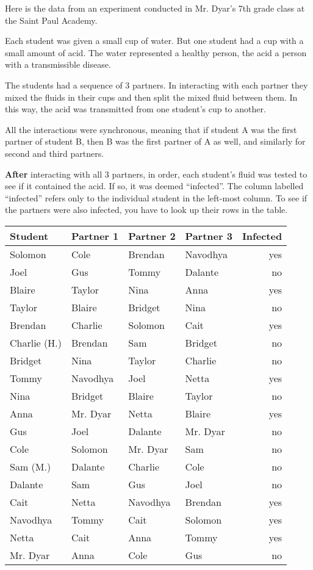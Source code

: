 
Here is the data from an experiment conducted in Mr. Dyar's 7th grade class at the Saint Paul Academy.

Each student was given a small cup of water.  But one student had a cup with a small amount of acid.  The water represented a healthy person, the acid a person with a transmissible disease.

The students had a sequence of 3 partners.   In interacting with each
partner they mixed the fluids in their cups and then split the mixed
fluid between them.  In this way, the acid was transmitted from one
student's cup to another.

All the interactions were synchronous, meaning that if student A was the first partner of student B, then B was the first partner of A as well, and similarly for second and third partners.  

{\bf After} interacting with all 3 partners, in order, each student's fluid
was tested to see if it contained the acid.  If so, it was deemed
``infected''.  The column labelled ``infected'' refers only to the
individual student in the left-most column.  To see if the partners
were also infected, you have to look up their rows in the table.


\begin{tabular}{l|lll|r}
Student & Partner 1 & Partner 2 & Partner 3 & Infected\\\hline
 Solomon & Cole & Brendan & Navodhya  & yes\\
 Joel &  Gus & Tommy  & Dalante  & no \\
 Blaire &  Taylor & Nina  &  Anna & yes \\
 Taylor &  Blaire & Bridget  & Nina  &  no\\ 
 Brendan &  Charlie & Solomon  & Cait  & yes  \\
 Charlie (H.) &  Brendan & Sam  & Bridget  & no\\ 
 Bridget &  Nina & Taylor  & Charlie  & no \\
 Tommy &  Navodhya & Joel  & Netta  & yes\\ 
 Nina &  Bridget & Blaire   & Taylor  & no   \\
 Anna &  Mr. Dyar & Netta  & Blaire  &  yes \\
 Gus &  Joel & Dalante  & Mr. Dyar  & no \\
 Cole &  Solomon & Mr. Dyar  & Sam  & no\\ 
 Sam (M.) &  Dalante & Charlie  & Cole  & no\\ 
 Dalante &  Sam & Gus  & Joel  & no\\
 Cait &  Netta & Navodhya  & Brendan  & yes \\
 Navodhya &  Tommy & Cait   &  Solomon & yes \\
Netta & Cait & Anna & Tommy & yes \\
Mr. Dyar & Anna & Cole & Gus & no\\\hline
\end{tabular}

